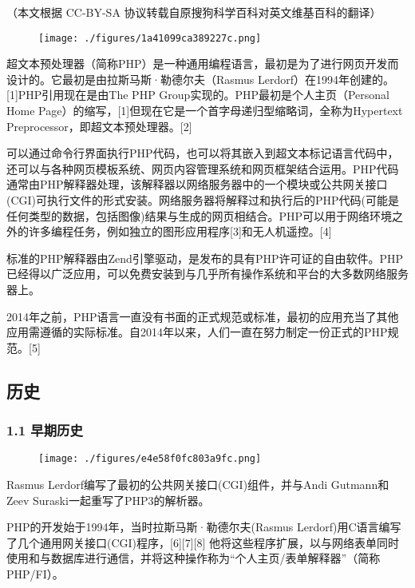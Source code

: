 
（本文根据 CC-BY-SA 协议转载自原搜狗科学百科对英文维基百科的翻译）

\begin{figure}[ht]
\centering
\texttt{[image: ./figures/1a41099ca389227c.png]}
\caption\label{fig_PHP_8}
\end{figure}

超文本预处理器（简称PHP）是一种通用编程语言，最初是为了进行网页开发而设计的。它最初是由拉斯马斯·勒德尔夫（Rasmus Lerdorf）在1994年创建的。[1]PHP引用现在是由The PHP Group实现的。PHP最初是个人主页（Personal Home Page）的缩写，[1]但现在它是一个首字母递归型缩略词，全称为Hypertext Preprocessor，即超文本预处理器。[2]

可以通过命令行界面执行PHP代码，也可以将其嵌入到超文本标记语言代码中，还可以与各种网页模板系统、网页内容管理系统和网页框架结合运用。PHP代码通常由PHP解释器处理，该解释器以网络服务器中的一个模块或公共网关接口(CGI)可执行文件的形式安装。网络服务器将解释过和执行后的PHP代码(可能是任何类型的数据，包括图像)结果与生成的网页相结合。PHP可以用于网络环境之外的许多编程任务，例如独立的图形应用程序[3]和无人机遥控。[4]

标准的PHP解释器由Zend引擎驱动，是发布的具有PHP许可证的自由软件。PHP已经得以广泛应用，可以免费安装到与几乎所有操作系统和平台的大多数网络服务器上。

2014年之前，PHP语言一直没有书面的正式规范或标准，最初的应用充当了其他应用需遵循的实际标准。自2014年以来，人们一直在努力制定一份正式的PHP规范。[5]

\subsection{历史}
\subsubsection{1.1 早期历史}
\begin{figure}[ht]
\centering
\texttt{[image: ./figures/e4e58f0fc803a9fc.png]}
\caption\label{fig_PHP_1}
\end{figure}
Rasmus Lerdorf编写了最初的公共网关接口(CGI)组件，并与Andi Gutmann和Zeev Suraski一起重写了PHP3的解析器。

PHP的开发始于1994年，当时拉斯马斯·勒德尔夫(Rasmus Lerdorf)用C语言编写了几个通用网关接口(CGI)程序，[6][7][8] 他将这些程序扩展，以与网络表单同时使用和与数据库进行通信，并将这种操作称为“个人主页/表单解释器”（简称 PHP/FI）。

